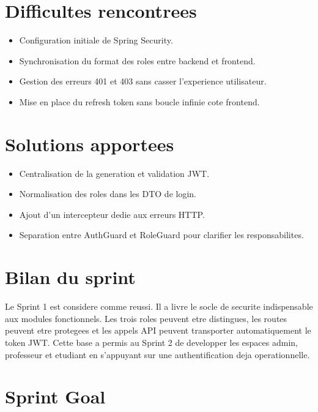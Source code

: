 \documentclass[12pt,a4paper]{report}
\begin{document}
\section{Difficultes rencontrees}

\begin{itemize}[itemsep=0.3em]
    \item Configuration initiale de Spring Security.
    \item Synchronisation du format des roles entre backend et frontend.
    \item Gestion des erreurs 401 et 403 sans casser l'experience utilisateur.
    \item Mise en place du refresh token sans boucle infinie cote frontend.
\end{itemize}

\section{Solutions apportees}

\begin{itemize}[itemsep=0.3em]
    \item Centralisation de la generation et validation JWT.
    \item Normalisation des roles dans les DTO de login.
    \item Ajout d'un intercepteur dedie aux erreurs HTTP.
    \item Separation entre AuthGuard et RoleGuard pour clarifier les responsabilites.
\end{itemize}

\section{Bilan du sprint}

Le Sprint 1 est considere comme reussi. Il a livre le socle de securite indispensable aux modules fonctionnels. Les trois roles peuvent etre distingues, les routes peuvent etre protegees et les appels API peuvent transporter automatiquement le token JWT. Cette base a permis au Sprint 2 de developper les espaces admin, professeur et etudiant en s'appuyant sur une authentification deja operationnelle.

\iffalse

\section{Sprint Goal}
\end{document}
